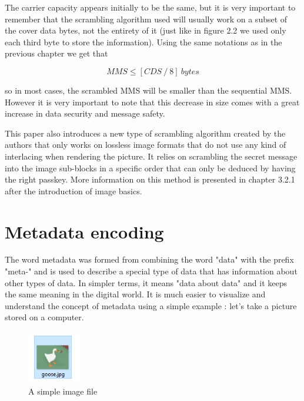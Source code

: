 \begin{multicols*}{2}
The carrier capacity appears initially to be the same, but it is very important to remember that the scrambling algorithm used will usually work on a subset of the cover data bytes, not the entirety of it (just like in figure 2.2 we used only each third byte to store the information). Using the same notations as in the previous chapter we get that 

\[ MMS \leq [CDS \ / \ 8] \ bytes \]

so in most cases, the scrambled MMS will be smaller than the sequential MMS. However it is very important to note that this decrease in size comes with a great increase in data security and message safety.

This paper also introduces a new type of scrambling algorithm created by the authors that only works on lossless image formats that do not use any kind of interlacing when rendering the picture. It relies on scrambling the secret message into the image sub-blocks in a specific order that can only be deduced by having the right passkey. More information on this method is presented in chapter 3.2.1 after the introduction of image basics.


\section{Metadata encoding}
The word metadata was formed from combining the word "data" with the prefix "meta-" and is used to describe a special type of data that has information about other types of data\cite{metadata-origin}. In simpler terms, it means "data about data" and it keeps the same meaning in the digital world. It is much easier to visualize and understand the concept of metadata using a simple example : let's take a picture stored on a computer.

\begin{figure}[H]
    \centering
    \includegraphics[width=2.3cm,keepaspectratio]{pics/goose_file}
    \caption{A simple image file}
    \label{Goose Image File}
\end{figure}


\end{multicols*}
